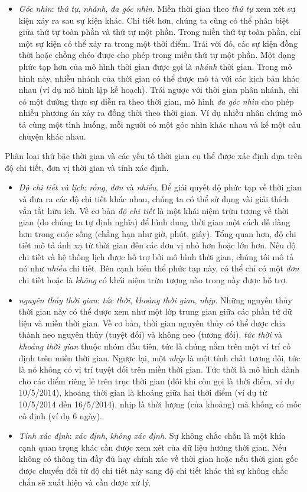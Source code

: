 \begin{itemize}
    \item \textit{Góc nhìn}: \textit{thứ tự}, \textit{nhánh}, \textit{đa góc nhìn}. Miền thời gian theo \textit{thứ tự} xem xét sự kiện xảy ra sau sự kiện khác. Chi tiết hơn, chúng ta cũng có thể phân biệt giữa thứ tự toàn phần và thứ tự một phần. Trong miền thứ tự toàn phần, chỉ một sự kiện có thể xảy ra trong một thời điểm. Trái với đó, các sự kiện đồng thời hoặc chồng chéo được cho phép trong miền thứ tự một phần. Một dạng phức tạp hơn của mô hình thời gian được gọi là \textit{nhánh} thời gian. Trong mô hình này, nhiều nhánh của thời gian có thể được mô tả với các kịch bản khác nhau (ví dụ mô hình lập kế hoạch). Trái ngược với thời gian phân nhánh, chỉ có một đường thực sự diễn ra theo thời gian, mô hình \textit{đa góc nhìn} cho phép nhiều phương án xảy ra đồng thời theo thời gian. Ví dụ nhiều nhân chứng mô tả cùng một tình huống, mỗi người có một góc nhìn khác nhau và kể một câu chuyện khác nhau.
\end{itemize}
Phân loại thứ bậc thời gian và các yếu tố thời gian cụ thể được xác định dựa trên độ chi tiết, đơn vị thời gian và tính xác định.
\begin{itemize}
    \item \textit{Độ chi tiết và lịch}: \textit{rỗng}, \textit{đơn} và \textit{nhiều}. Để giải quyết độ phức tạp về thời gian và đưa ra các độ chi tiết khác nhau, chúng ta có thể sử dụng vài giải thích vắn tắt hữu ích. Về cơ bản \textit{độ chi tiết} là một khái niệm trừu tượng về thời gian (do chúng ta tự định nghĩa) để hình dung thời gian một cách dễ dàng hơn trong cuộc sống (chẳng hạn như giờ, phút, giây). Tổng quan hơn, độ chi tiết mô tả ánh xạ từ thời gian đến các đơn vị nhỏ hơn hoặc lớn hơn. Nếu độ chi tiết và hệ thống lịch được hỗ trợ bởi mô hình thời gian, chúng tôi mô tả nó như \textit{nhiều} chi tiết. Bên cạnh biến thể phức tạp này, có thể chỉ có một \textit{đơn} chi tiết hoặc là \textit{không} có khái niệm trừu tượng nào trong này được hỗ trợ.
    \item \textit{nguyên thủy thời gian}: \textit{tức thời}, \textit{khoảng thời gian}, \textit{nhịp}. Những nguyên thủy thời gian này có thể được xem như một lớp trung gian giữa các phần tử dữ liệu và miền thời gian. Về cơ bản, thời gian nguyên thủy có thể được chia thành neo nguyên thủy (tuyệt đối) và không neo (tương đối). \textit{tức thời} và \textit{khoảng thời gian} thuộc nhóm đầu tiên, tức là chúng nằm trên một ví trí cố định trên miền thời gian. Ngược lại, một \textit{nhịp} là một tính chất tương đối, tức là nó không có vị trí tuyệt đối trên miền thời gian. Tức thời là mô hình dành cho các điểm riêng lẻ trên trục thời gian (đôi khi còn gọi là thời điểm, ví dụ 10/5/2014), khoảng thời gian là khoảng giữa hai thời điểm (ví dụ từ 10/5/2014 đến 16/5/2014), nhịp là thời lượng (của khoảng) mà không có mốc cố định (ví dụ 6 ngày).
    \item \textit{Tính xác định}: \textit{xác định}, \textit{không xác định}. Sự không chắc chắn là một khía cạnh quan trọng khác cần được xem xét của dữ liệu hướng thời gian. Nếu không có thông tin đầy đủ hay chính xác về thời gian hoặc nếu thời gian gốc được chuyển đổi từ độ chi tiết này sang độ chi tiết khác thì sự không chắc chắn sẽ xuất hiện và cần được xử lý.
\end{itemize}